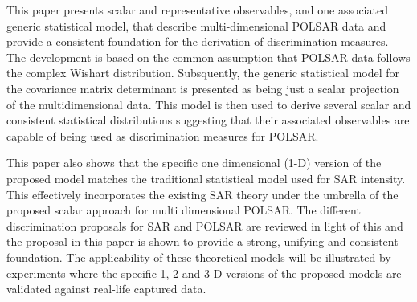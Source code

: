 \documentclass[printer]{tRSL2e}
\begin{document}
This paper presents scalar and representative observables,
  and one associated generic statistical model,
  that describe multi-dimensional POLSAR data and provide a consistent foundation for the derivation of discrimination measures.
The development is based on the common assumption that POLSAR data follows the complex Wishart distribution.  
Subsquently, the generic statistical model for the covariance matrix determinant is presented as being just a scalar projection of the multidimensional data.
This model is then used to derive several scalar and consistent statistical distributions suggesting that their associated observables are capable of being used as discrimination measures for POLSAR.
%

This paper also shows that %
  the specific one dimensional (1-D) version of the proposed  model 
  matches %
  the traditional statistical model used for SAR intensity.
This effectively incorporates the existing SAR theory under the umbrella of the proposed scalar approach for multi dimensional POLSAR.
The different discrimination proposals for SAR and POLSAR are reviewed in light of this and the  proposal in this paper is shown to provide a strong, unifying and consistent foundation. %
The applicability of these theoretical models will be illustrated by experiments where the specific 1, 2 and 3-D versions of the proposed models are validated against real-life captured data. 
\end{document}
